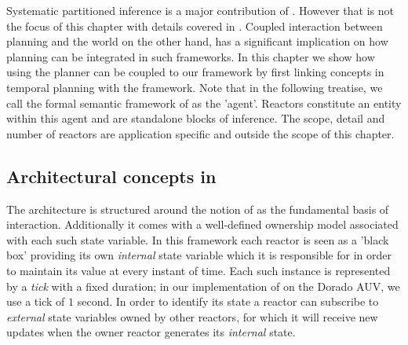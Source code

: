 Systematic partitioned inference is a major contribution of
\rx. However that is not the focus of this chapter with details
covered in \cite{py10, rajan12}. Coupled interaction between planning
and the world on the other hand, has a significant implication on how
planning can be integrated in such frameworks. In this chapter we show
how using the \eu planner can be coupled to our framework by first
linking concepts in temporal planning with the \rx framework. Note
that in the following treatise, we call the formal semantic framework
of \rx as the 'agent'. Reactors constitute an entity within this agent
and are standalone blocks of inference. The scope, detail and number
of reactors are application specific and outside the scope of this
chapter.


\subsection{Architectural concepts in \rx}
\label{sec:arch:trex}

The \rx architecture is structured around the notion of  as the fundamental basis of interaction. Additionally it
comes with a well-defined ownership model associated with each such
state variable. In this framework each reactor is seen as a 'black
box' providing its own {\em internal} state variable which it is
responsible for in order to maintain its value at every instant of
time. Each such instance is represented by a {\em tick} with a fixed
duration; in our implementation of \rx on the Dorado AUV, we use a
tick of $1$ second. In order to identify its state a reactor can
subscribe to {\em external} state variables owned by other reactors,
for which it will receive new updates when the owner reactor generates
its {\em internal} state.

